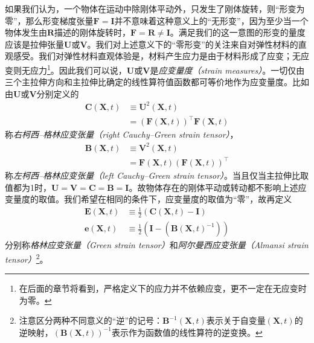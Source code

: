 \documentclass[main.tex]{subfiles}
\begin{document}
如果我们认为，一个物体在运动中除刚体平动外，只发生了刚体旋转，则“形变为零”，那么形变梯度张量$\mathbf{F}=\mathbf{I}$并不意味着这种意义上的“无形变”，因为至少当一个物体发生由$\mathbf{R}$描述的刚体旋转时，$\mathbf{F}=\mathbf{R}\neq\mathbf{I}$。满足我们的这一意图的形变的量度应该是拉伸张量$\mathbf{U}$或$\mathbf{V}$。我们对上述意义下的“零形变”的关注来自对弹性材料的直观感受。我们对弹性材料直观体验是，材料产生应力是由于材料形成了应变；无应变则无应力\footnote{在后面的章节将看到，严格定义下的应力并不依赖应变，更不一定在无应变时为零。}。因此我们可以说，$\mathbf{U}$或$\mathbf{V}$是\emph{应变量度（strain measures）}。一切仅由三个主拉伸方向和主拉伸比确定的线性算符值函数都可等价地作为应变量度\cite[Sect.32]{Truesdell1960}。比如由$\mathbf{U}$或$\mathbf{V}$分别定义的
\begin{align*}
    \mathbf{C}\left(\mathbf{X},t\right) & \equiv\mathbf{U}^2\left(\mathbf{X},t\right)                                                    \\
                                        & =\left(\mathbf{F}\left(\mathbf{X},t\right)\right)^\intercal\mathbf{F}\left(\mathbf{X},t\right)
\end{align*}
称\emph{右柯西--格林应变张量（right Cauchy--Green strain tensor）}，
\begin{align*}
    \mathbf{B}\left(\mathbf{X},t\right) & \equiv\mathbf{V}^2\left(\mathbf{X},t\right)                                                    \\
                                        & =\mathbf{F}\left(\mathbf{X},t\right)\left(\mathbf{F}\left(\mathbf{X},t\right)\right)^\intercal
\end{align*}
称\emph{左柯西--格林应变张量（left Cauchy--Green strain tensor）}。当且仅当主拉伸比取值都为1时，$\mathbf{U}=\mathbf{V}=\mathbf{C}=\mathbf{B}=\mathbf{I}$。故物体存在的刚体平动或转动都不影响上述应变量度的取值。我们希望在相同的条件下，应变量度的取值为“零”，故再定义
\begin{align*}
    \mathbf{E}\left(\mathbf{X},t\right) & \equiv\frac{1}{2}\left(\mathbf{C}\left(\mathbf{X},t\right)-\mathbf{I}\right)                   \\
    \mathbf{e}\left(\mathbf{X},t\right) & \equiv\frac{1}{2}\left(\mathbf{I}-\left(\mathbf{B}\left(\mathbf{X},t\right)^{-1}\right)\right)
\end{align*}
分别称\emph{格林应变张量（Green strain tensor）}和\emph{阿尔曼西应变张量（Almansi strain tensor）}\footnote{注意区分两种不同意义的“逆”的记号：$\mathbf{B}^{-1}\left(\mathbf{X},t\right)$表示关于自变量$\left(\mathbf{X},t\right)$的逆映射，$\left(\mathbf{B}\left(\mathbf{X},t\right)\right)^{-1}$表示作为函数值的线性算符的逆变换。}。
\end{document}
